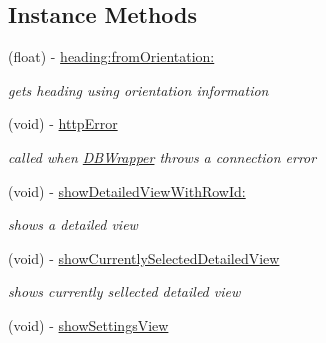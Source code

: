 \subsection*{Instance Methods}
\begin{DoxyCompactItemize}
\item 
(float) -\/ \hyperlink{interface_virt_tour_view_controller_ad0a15a981164a1c8672093c5e40496db}{heading\-:from\-Orientation\-:}
\begin{DoxyCompactList}\small\item\em gets heading using orientation information \end{DoxyCompactList}\item 
\hypertarget{interface_virt_tour_view_controller_a7ba3f39280d7772b515d51f9d29f2f69}{(void) -\/ \hyperlink{interface_virt_tour_view_controller_a7ba3f39280d7772b515d51f9d29f2f69}{http\-Error}}\label{interface_virt_tour_view_controller_a7ba3f39280d7772b515d51f9d29f2f69}

\begin{DoxyCompactList}\small\item\em called when \hyperlink{interface_d_b_wrapper}{D\-B\-Wrapper} throws a connection error \end{DoxyCompactList}\item 
(void) -\/ \hyperlink{interface_virt_tour_view_controller_aad30a8527c4001182ea88f62b6065944}{show\-Detailed\-View\-With\-Row\-Id\-:}
\begin{DoxyCompactList}\small\item\em shows a detailed view \end{DoxyCompactList}\item 
\hypertarget{interface_virt_tour_view_controller_ad9c6f03d61cbd98f30ba1abbedd5b6ba}{(void) -\/ \hyperlink{interface_virt_tour_view_controller_ad9c6f03d61cbd98f30ba1abbedd5b6ba}{show\-Currently\-Selected\-Detailed\-View}}\label{interface_virt_tour_view_controller_ad9c6f03d61cbd98f30ba1abbedd5b6ba}

\begin{DoxyCompactList}\small\item\em shows currently sellected detailed view \end{DoxyCompactList}\item 
\hypertarget{interface_virt_tour_view_controller_ae3c87c14ac49d18c3f3ea69650311440}{(void) -\/ \hyperlink{interface_virt_tour_view_controller_ae3c87c14ac49d18c3f3ea69650311440}{show\-Settings\-View}}\label{interface_virt_tour_view_controller_ae3c87c14ac49d18c3f3ea69650311440}


\end{DoxyCompactItemize}
